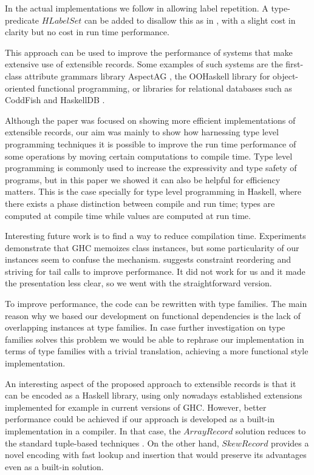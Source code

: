 \documentclass[natbib]{sigplanconf}
\newcommand{\Conid}[1]{\mathit{#1}}
\begin{document}
In the actual implementations we follow \cite{Leijen:scopedlabels} in allowing label repetition.  
A type-predicate \ensuremath{\Conid{HLabelSet}} can be added to disallow this as in \cite{KLS04}, with a slight cost in clarity but no cost in run time performance.

This approach can be used to improve the performance of systems
that make extensive use of extensible records. 
Some examples of such systems are the first-class attribute grammars library AspectAG \cite{FlyFirstClass}, 
the OOHaskell \cite{OOHaskell} library for object-oriented functional programming,
or libraries for relational databases such as CoddFish \cite{SV06} and HaskellDB \cite{haskelldb}.

Although the paper was focused on showing more efficient implementations of extensible records,
our aim was mainly to show how harnessing type level programming techniques it is possible
to improve the run time performance of some operations by moving certain computations to compile time.
Type level programming is commonly used to increase the expressivity and type safety of programs,
but in this paper we showed it can also be helpful for efficiency matters. 
This is the case specially for type level programming in Haskell, 
where there exists a phase distinction between compile and run time;
types are computed at compile time while values are computed at run time.

Interesting future work is to find a way to reduce compilation time.
Experiments demonstrate that GHC memoizes class instances,
but some particularity of our instances seem to confuse the mechanism.
\cite{PerfLeaks} suggests constraint reordering and striving for tail calls to improve
performance.
It did not work for us and it made the presentation less clear, so we went with the straightforward version. 

To improve performance, the code can be rewritten with type families. 
The main reason why we based our development on functional dependencies is the lack of overlapping instances at type families. 
In case further investigation on type families solves this problem we would be able to rephrase our implementation 
in terms of type families with a trivial translation, achieving a more functional style implementation.

An interesting aspect of the proposed approach to extensible records is that it can be encoded as a Haskell library, 
using only nowadays established extensions implemented for example in current versions of GHC.
However, better performance could be achieved if our approach is developed as a built-in implementation in a compiler. 
In that case, the \ensuremath{\Conid{ArrayRecord}} solution reduces to the standard tuple-based techniques \cite{Gaster96apolymorphic}.
On the other hand, \ensuremath{\Conid{SkewRecord}} provides a novel encoding with fast lookup and insertion that would preserve its advantages
even as a built-in solution.
\end{document}
